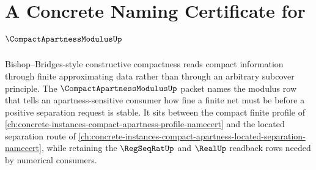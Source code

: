 \chapter{A Concrete Naming Certificate for $\CompactApartnessModulusUp$}
\label{ch:concrete-instances-compact-apartness-modulus-namecert}

Bishop--Bridges-style constructive compactness reads compact information through finite approximating data rather than through an arbitrary subcover principle. The $\CompactApartnessModulusUp$ packet names the modulus row that tells an apartness-sensitive consumer how fine a finite net must be before a positive separation request is stable. It sits between the compact finite profile of \autoref{ch:concrete-instances-compact-apartness-profile-namecert} and the located separation route of \autoref{ch:concrete-instances-compact-apartness-located-separation-namecert}, while retaining the $\RegSeqRatUp$ and $\RealUp$ readback rows needed by numerical consumers.

